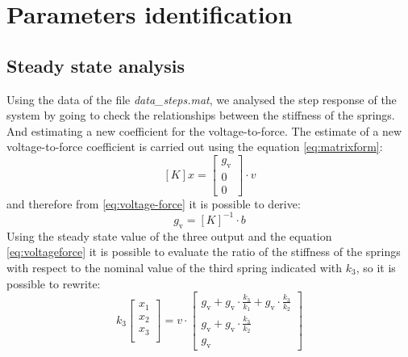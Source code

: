 \chapter{Parameters identification}
\label{chap:paramidentification}
\section{Steady state analysis}
\label{sec:steadystate}
Using the data of the file \emph{data\_steps.mat}, we analysed the step response
of the system by going to check the relationships between the stiffness of the 
springs. 
And estimating a new coefficient for the voltage-to-force.
The estimate of a new voltage-to-force coefficient is carried out using the 
equation \eqref{eq:matrixform}:
\begin{equation} \label{eq:voltage-force}
	[K] x = \begin{bmatrix}
 			g_{\text{v}}	\\
 			0 	\\
 			0
 		\end{bmatrix} \cdot v
\end{equation}
and therefore from \eqref{eq:voltage-force} it is possible to derive:
\begin{equation} \label{eq:voltageforce}
	g_{\text{v}} = [K]^{-1} \cdot b
\end{equation}
Using the steady state value of the three output and the equation 
\eqref{eq:voltageforce} it is possible to evaluate the ratio of the stiffness 
of the springs with respect to  the nominal value of the third spring indicated 
with $k_3$, so it is possible to rewrite:
\begin{equation}
	\label{eq:gvestimate}
	k_3 \begin{bmatrix}
		x_1\\
		x_2\\
		x_3\\
	\end{bmatrix} = v \cdot
	\begin{bmatrix}
		g_{\text{v}} + g_{\text{v}} \cdot \frac{k_3}{k_1} + g_{\text{v}} \cdot 
		\frac{k_{3}}{k_{2}}\\
    		g_{\text{v}} + g_{\text{v}} \cdot \frac{k_{3}}{k_{2}}\\
    		g_{\text{v}}
    \end{bmatrix}
\end{equation}
